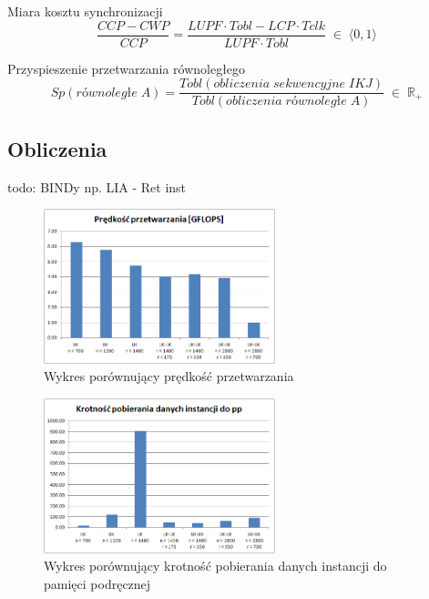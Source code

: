 \documentclass[12pt,a4paper]{article}
\begin{document}
Miara kosztu synchronizacji
\begin{equation}
\frac{CCP - CWP}{CCP} = \frac{LUPF \cdot Tobl - LCP \cdot Tclk}{LUPF \cdot Tobl}
\; \in \; \langle 0,1 \rangle
\end{equation}

Przyspieszenie przetwarzania równoległego  %
\begin{equation}
Sp(równoległe\; A) = \frac{Tobl(obliczenia\; sekwencyjne\; IKJ)}{Tobl(obliczenia\; równoległe\; A)}
\; \in \; \mathbb{R}_+
\end{equation}


\subsection{Obliczenia}
todo: BINDy np. LIA - Ret inst

\begin{figure}[H]
  \centering
    \includegraphics[width=0.60\textwidth]{../Results/charts/GFLOPS.png}
    \caption{Wykres porównujący prędkość przetwarzania}
\end{figure}

\begin{figure}[H]
  \centering
    \includegraphics[width=0.60\textwidth]{../Results/charts/krotnosc.png}
    \caption{Wykres porównujący krotność pobierania danych instancji do pamięci podręcznej}
\end{figure}
\end{document}
